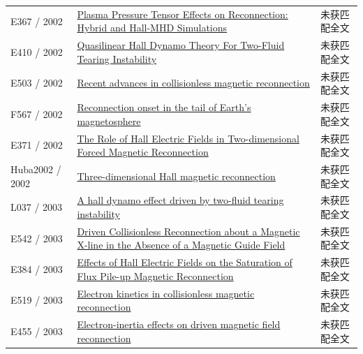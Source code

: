 \begin{longtable}{P{24mm}P{97mm}P{27mm}}
E367 / 2002 & \href{https://ui.adsabs.harvard.edu/abs/2002APS..DPPUI1005Y/abstract}{Plasma Pressure Tensor Effects on Reconnection: Hybrid and Hall-MHD Simulations} & 未获匹配全文\\

E410 / 2002 & \href{https://ui.adsabs.harvard.edu/abs/2002APS..DPPCP1015M/abstract}{Quasilinear Hall Dynamo Theory For Two-Fluid Tearing Instability} & 未获匹配全文\\

E503 / 2002 & \href{https://doi.org/10.1088/0741-3335/44/12b/327}{Recent advances in collisionless magnetic reconnection} & 未获匹配全文\\

F567 / 2002 & \href{https://doi.org/10.1029/2001ja009148}{Reconnection onset in the tail of Earth's magnetosphere} & 未获匹配全文\\

E371 / 2002 & \href{http://ui.adsabs.harvard.edu/abs/2002AGUFMSM61A0467D/abstract}{The Role of Hall Electric Fields in Two-dimensional Forced Magnetic Reconnection} & 未获匹配全文\\

Huba2002 / 2002 & \href{https://doi.org/10.1063/1.1514970}{Three-dimensional Hall magnetic reconnection} & 未获匹配全文\\

L037 / 2003 & \href{https://doi.org/10.1134/1.1592555}{A hall dynamo effect driven by two-fluid tearing instability} & 未获匹配全文\\

E542 / 2003 & \href{http://citeseerx.ist.psu.edu/viewdoc/summary?doi=10.1.1.959.2557}{Driven Collisionless Reconnection about a Magnetic X-line in the Absence of a Magnetic Guide Field} & 未获匹配全文\\

E384 / 2003 & \href{http://ui.adsabs.harvard.edu/abs/2003EAEJA.....7302D/abstract}{Effects of Hall Electric Fields on the Saturation of Flux Pile-up Magnetic Reconnection} & 未获匹配全文\\

E519 / 2003 & \href{https://doi.org/10.1088/0741-3335/45/12a/020}{Electron kinetics in collisionless magnetic reconnection} & 未获匹配全文\\

E455 / 2003 & \href{https://doi.org/10.1063/1.1615242}{Electron-inertia effects on driven magnetic field reconnection} & 未获匹配全文\\


\end{longtable}
